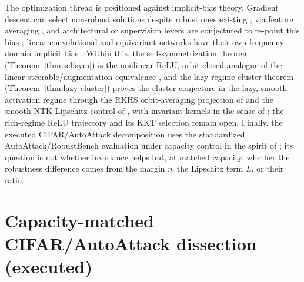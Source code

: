 \documentclass[11pt]{article}
\theoremstyle{plain}
\theoremstyle{definition}
\theoremstyle{remark}
\begin{document}
The optimization thread is positioned against implicit-bias theory.  Gradient descent can select non-robust solutions despite robust ones existing \citep{Frei2023}, via feature averaging \citep{LiFeature2024}, and architectural or supervision levers are conjectured to re-point this bias \citep{MinVidal2024}; linear convolutional and equivariant networks have their own frequency-domain implicit bias \citep{Gunasekar2018,Lawrence2021,ChenZhu2023}.  Within this, the self-symmetrization theorem (Theorem~\ref{thm:selfsym}) is the nonlinear-ReLU, orbit-closed analogue of the linear steerable/augmentation equivalence \citep{ChenZhu2023}, and the lazy-regime cluster theorem (Theorem~\ref{thm:lazy-cluster}) proves the cluster conjecture in the lazy, smooth-activation regime through the RKHS orbit-averaging projection of \citet{Elesedy2021kernel} and the smooth-NTK Lipschitz control of \citet{BiettiMairalNTK2019}, with invariant kernels in the sense of \citet{HaasdonkBurkhardt2007}; the rich-regime ReLU trajectory and its KKT selection remain open.  Finally, the executed CIFAR/AutoAttack decomposition uses the standardized AutoAttack/RobustBench evaluation \citep{AutoAttack2020,RobustBench2020} under capacity control in the spirit of \citet{RobArch2023}; its question is not whether invariance helps but, at matched capacity, whether the robustness difference comes from the margin $\eta$, the Lipschitz term $L$, or their ratio.

\section{Capacity-matched CIFAR/AutoAttack dissection (executed)}\label{sec:cifar-plan}
\end{document}
